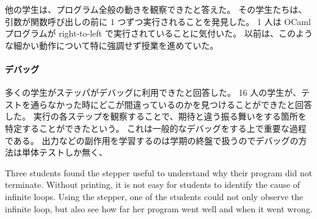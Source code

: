 他の学生は、プログラム全般の動きを観察できたと答えた。
その学生たちは、引数が関数呼び出しの前に 1 つずつ実行されることを発見した。
1 人は OCaml プログラムが right-to-left で実行されていることに気付いた。
以前は、このような細かい動作について特に強調せず授業を進めていた。

\paragraph{デバッグ}
多くの学生がステッパがデバッグに利用できたと回答した。
16 人の学生が、テストを通らなかった時にどこが間違っているのかを見つけることができたと回答した。
実行の各ステップを観察することで、期待と違う振る舞いをする箇所を特定することができたという。
これは一般的なデバッグをする上で重要な過程である。
出力などの副作用を学習するのは学期の終盤で扱うのでデバッグの方法は単体テストしか無く、


Three students found the stepper useful to understand why their
program did not terminate.
Without printing, it is not easy for students to identify the cause of
infinite loops.
Using the stepper, one of the students could not only observe
the infinite loop, but also see how far her program went well
and when it went wrong.

